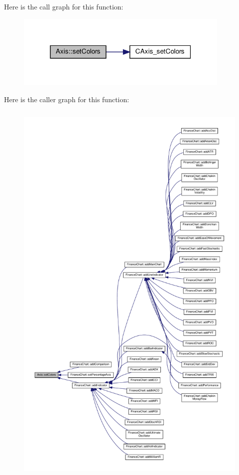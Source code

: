 Here is the call graph for this function\+:
\nopagebreak
\begin{figure}[H]
\begin{center}
\leavevmode
\includegraphics[width=291pt]{class_axis_a54d88ba3d4791b92a3efb757b3ea5c48_cgraph}
\end{center}
\end{figure}
Here is the caller graph for this function\+:
\nopagebreak
\begin{figure}[H]
\begin{center}
\leavevmode
\includegraphics[height=550pt]{class_axis_a54d88ba3d4791b92a3efb757b3ea5c48_icgraph}
\end{center}
\end{figure}
\mbox{\label{class_axis_aac131ccbb91b9c5587334e2703923b70}} 

